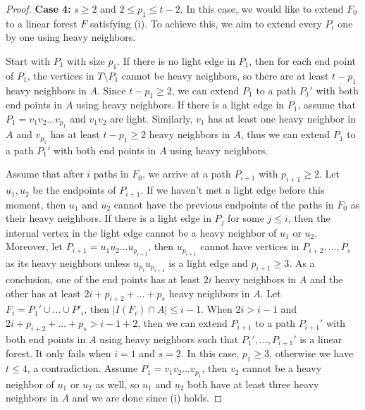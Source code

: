 \documentclass[10pt,a4paper]{amsart}
\begin{document}
\begin{proof}
    
    \textbf{Case 4:} $s \ge 2$ and $2 \le p_1 \le t-2$.
    In this case, we would like to extend $F_0$ to a linear forest $F$ satisfying (i).
    To achieve this, we aim to extend every $P_i$ one by one using heavy neighbors.

    Start with $P_1$ with size $p_1$.
    If there is no light edge in $P_1$, then for each end point of $P_1$, the vertices in $T\setminus P_1$ cannot be heavy neighbors, so there are at least $t - p_1$ heavy neighbors in $A$.
    Since $t - p_1 \ge 2$, we can extend $P_1$ to a path $P_1'$ with both end points in $A$ using heavy neighbors.
    If there is a light edge in $P_1$, assume that $P_1 = v_1v_2\ldots v_{p_1}$ and $v_{1}v_{2}$ are light.
    Similarly, $v_1$ has at least one heavy neighbor in $A$ and $v_{p_1}$ has at least $t - p_1 \ge 2$ heavy neighbors in $A$, thus we can extend $P_1$ to a path $P_1'$ with both end points in $A$ using heavy neighbors.

    Assume that after $i$ paths in $F_0$, we arrive at a path $P_{i+1}$ with $p_{i+1} \ge 2$. 
    Let $u_1,u_2$ be the endpoints of $P_{i+1}$.
    If we haven't met a light edge before this moment, then $u_1$ and $u_2$ cannot have the previous endpoints of the paths in $F_0$ as their heavy neighbors.
    If there is a light edge in $P_{j}$ for some $j \le i$, then the internal vertex in the light edge cannot be a heavy neighbor of $u_1$ or $u_2$.
    Moreover, let $P_{i+1} = u_1u_2\ldots u_{p_{i+1}}$, then $u_{p_{i+1}}$ cannot have vertices in $P_{i+2}, \ldots, P_{s}$ as its heavy neighbors unless $u_{p_{i}}u_{p_{i+1}}$ is a light edge and $p_{i+1} \ge 3$.
    As a conclusion, one of the end points has at least $2i$ heavy neighbors in $A$ and the other has at least $2i + p_{i+2} + \ldots + p_{s}$ heavy neighbors in $A$.
    Let $F_i=P_1'\cup\dots \cup P'_{i}$, then $|I(F_i)\cap A|\leq i-1$.
    When $2i > i-1$ and $2i + p_{i+2} + \ldots + p_{s} > i-1 +2$, then we can extend $P_{i+1}$ to a path $P_{i+1}'$ with both end points in $A$ using heavy neighbors such that $P_1', \ldots, P_{i+1}'$ is a linear forest.
    It only fails when $i=1$ and $s=2$.
    In this case, $p_1 \ge 3$, otherwise we have $t \le 4$, a contradiction.
    Assume $P_1 = v_1v_2\ldots v_{p_1}$, then $v_2$ cannot be a heavy neighbor of $u_1$ or $u_2$ as well, so $u_1$ and $u_2$ both have at least three heavy neighbors in $A$ and we are done since (i) holds.
    

\end{proof}
\end{document}
